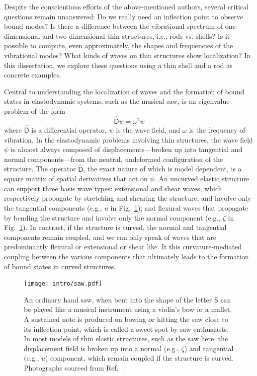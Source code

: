 Despite the conscientious efforts of the above-mentioned authors, several critical questions remain unanswered: Do we really need an inflection point to observe bound modes?  Is there a difference between the vibrational spectrum of one-dimensional and two-dimensional thin structures, i.e., rods vs. shells?
Is it possible to compute, even approximately, the shapes and frequencies of the vibrational modes?
What kinds of waves on thin structures show localization?
In this dissertation, we explore these questions using a thin shell and a rod as concrete examples.

Central to understanding the localization of waves and the formation of bound states in elastodynamic systems, such as the musical saw, is an eigenvalue problem of the form
%
\begin{equation}
  \widehat{\mathsf{D}}\psi = \omega^{2}\psi
  \label{intro:eq:waveeq}
\end{equation}
%
where $\widehat{\mathsf{D}}$ is a differential operator, $\psi$ is the wave field, and $\omega$ is the frequency of vibration.
In the elastodynamic problems involving thin structures, the wave field $\psi$ is almost always composed of displacements---broken up into tangential and normal components---from the neutral, undeformed configuration of the structure.
The operator $\widehat{\mathsf{D}}$, the exact nature of which is model dependent, is a square matrix of spatial derivatives that act on $\psi$.
An uncurved elastic structure can support three basis wave types: extensional and shear waves, which respectively propagate by stretching and shearing the structure, and involve only the tangential components (e.g., $u$ in Fig.~\ref{fig:saw}); and flexural waves that propagate by bending the structure and involve only the normal component (e.g., $\zeta$ in Fig.~\ref{fig:saw}).
In contrast, if the structure is curved, the normal and tangential components remain coupled, and we can only speak of waves that are predominantly flexural or extensional or shear like.
It this curvature-mediated coupling between the various components that ultimately leads to the formation of bound states in curved structures.
%
\begin{figure}
  \begin{center}
    \texttt{[image: intro/saw.pdf]}
  \end{center}
  \caption{%
    An ordinary hand saw, when bent into the shape of the letter $\mathsf{S}$ can be played like a musical instrument using a violin's bow or a mallet.
    A sustained note is produced on bowing or hitting the saw close to its inflection point, which is called a sweet spot by saw enthusiasts.
    In most models of thin elastic structures, such as the saw here, the displacement field is broken up into a normal (e.g., $\zeta$) and tangential (e.g., $u$) component, which remain coupled if the structure is curved.
    Photographs sourced from Ref.~\cite{shankar2022}.
  }
  \label{fig:saw}
\end{figure}

